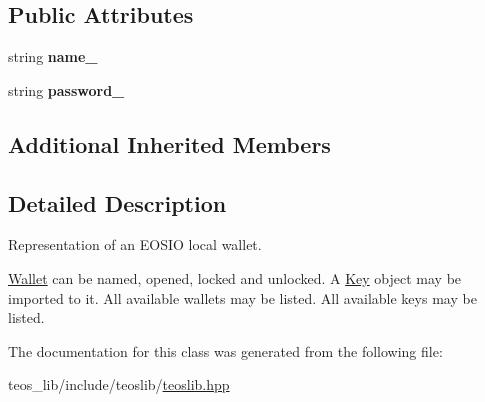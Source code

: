 \subsection*{Public Attributes}
\begin{DoxyCompactItemize}
\item 
\mbox{\label{classteoslib_1_1_wallet_a935befe97382d2481021076901951436}} 
string {\bfseries name\+\_\+}
\item 
\mbox{\label{classteoslib_1_1_wallet_a633892e13fc85c4e573785f4e3266660}} 
string {\bfseries password\+\_\+}
\end{DoxyCompactItemize}
\subsection*{Additional Inherited Members}


\subsection{Detailed Description}
Representation of an E\+O\+S\+IO local wallet. 

\mbox{\hyperlink{classteoslib_1_1_wallet}{Wallet}} can be named, opened, locked and unlocked. A \mbox{\hyperlink{classteoslib_1_1_key}{Key}} object may be imported to it. All available wallets may be listed. All available keys may be listed. 

The documentation for this class was generated from the following file\+:\begin{DoxyCompactItemize}
\item 
teos\+\_\+lib/include/teoslib/\mbox{\hyperlink{teoslib_8hpp}{teoslib.\+hpp}}\end{DoxyCompactItemize}
